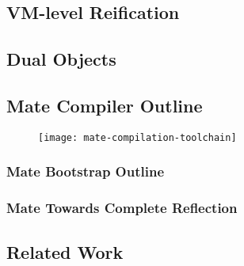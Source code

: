 \subsection{VM-level Reification}


\subsection{Dual Objects}



\subsection{Mate Compiler Outline}

\begin{figure}[H]
\centering
	\texttt{[image: mate-compilation-toolchain]}
\end{figure}

\subsubsection{Mate Bootstrap Outline}



\subsubsection{Mate Towards Complete Reflection}


\subsection{Related Work}




